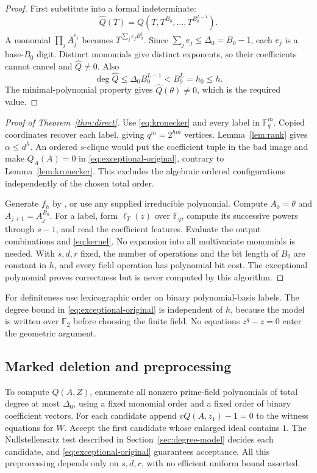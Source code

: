 \documentclass[11pt,a4paper]{article}
\newcommand{\F}{\mathbb F}
\theoremstyle{definition}
\theoremstyle{remark}
\numberwithin{equation}{section}
\begin{document}
\begin{proof}
First substitute into a formal indeterminate:
\[
\widehat Q(T)=Q(T,T^{B_0},\ldots,T^{B_0^{L-1}}).
\]
A monomial $\prod_jA_j^{e_j}$ becomes $T^{\sum_je_jB_0^j}$. Since $\sum_je_j\le\Delta_0=B_0-1$, each $e_j$ is a base-$B_0$ digit. Distinct monomials give distinct exponents, so their coefficients cannot cancel and $\widehat Q\ne0$. Also
\[
\deg\widehat Q\le\Delta_0B_0^{L-1}<B_0^L=h_0\le h.
\]
The minimal-polynomial property gives $\widehat Q(\theta)\ne0$, which is the required value.
\end{proof}

\begin{proof}[Proof of Theorem~\ref{thm:direct}]
Use \eqref{eq:kronecker} and every label in $\F_q^m$. Copied coordinates recover each label, giving $q^m=2^{hm}$ vertices. Lemma~\ref{lem:rank} gives $\alpha\le d^h$. An ordered $s$-clique would put the coefficient tuple in the bad image and make $Q_A(A)=0$ in \eqref{eq:exceptional-original}, contrary to Lemma~\ref{lem:kronecker}. This excludes the algebraic ordered configurations independently of the chosen total order.

Generate $f_h$ by \cite{Shoup}, or use any supplied irreducible polynomial. Compute $A_0=\theta$ and $A_{j+1}=A_j^{B_0}$. For a label, form $\ell_T(z)$ over $\F_q$, compute its successive powers through $s-1$, and read the coefficient features. Evaluate the output combinations and \eqref{eq:kernel}. No expansion into all multivariate monomials is needed. With $s,d,r$ fixed, the number of operations and the bit length of $B_0$ are constant in $h$, and every field operation has polynomial bit cost. The exceptional polynomial proves correctness but is never computed by this algorithm.
\end{proof}

For definiteness use lexicographic order on binary polynomial-basis labels. The degree bound in \eqref{eq:exceptional-original} is independent of $h$, because the model is written over $\F_2$ before choosing the finite field. No equations $z^q-z=0$ enter the geometric argument.

\subsection{Marked deletion and preprocessing}
To compute $Q(A,Z)$, enumerate all nonzero prime-field polynomials of total degree at most $\Delta_0$, using a fixed monomial order and a fixed order of binary coefficient vectors. For each candidate append $vQ(A,z_1)-1=0$ to the witness equations for $W$. Accept the first candidate whose enlarged ideal contains $1$. The Nullstellensatz test described in Section~\ref{sec:degree-model} decides each candidate, and \eqref{eq:exceptional-original} guarantees acceptance. All this preprocessing depends only on $s,d,r$, with no efficient uniform bound asserted.
\end{document}
